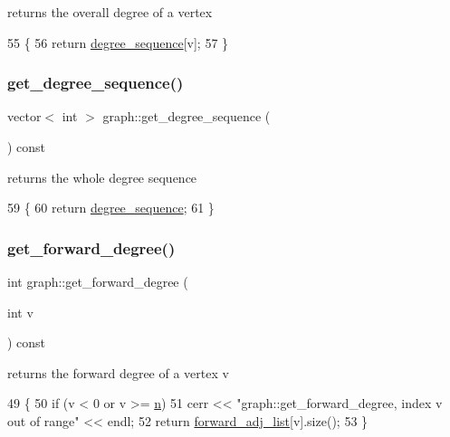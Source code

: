 returns the overall degree of a vertex 


\begin{DoxyCode}
55                                 \{
56   \textcolor{keywordflow}{return} \hyperlink{classgraph_a0b31295672bfe37669c9eb3640977fe6}{degree\_sequence}[v];
57 \}
\end{DoxyCode}
\mbox{\label{classgraph_afdca627df7fb93a7d1d8a547f616e948}} 
\subsubsection{\texorpdfstring{get\+\_\+degree\+\_\+sequence()}{get\_degree\_sequence()}}
{\footnotesize\ttfamily vector$<$ int $>$ graph\+::get\+\_\+degree\+\_\+sequence (\begin{DoxyParamCaption}{ }\end{DoxyParamCaption}) const}



returns the whole degree sequence 


\begin{DoxyCode}
59                                             \{
60   \textcolor{keywordflow}{return} \hyperlink{classgraph_a0b31295672bfe37669c9eb3640977fe6}{degree\_sequence};
61 \}
\end{DoxyCode}
\mbox{\label{classgraph_a388b6ce292a4c49e3853e22bdce978de}} 
\subsubsection{\texorpdfstring{get\+\_\+forward\+\_\+degree()}{get\_forward\_degree()}}
{\footnotesize\ttfamily int graph\+::get\+\_\+forward\+\_\+degree (\begin{DoxyParamCaption}\item[{int}]{v }\end{DoxyParamCaption}) const}



returns the forward degree of a vertex v 


\begin{DoxyCode}
49                                         \{
50   \textcolor{keywordflow}{if} (v < 0 or v >= \hyperlink{classgraph_ac8b3474ce95c04087c312508ec1443b6}{n})
51     cerr << \textcolor{stringliteral}{"graph::get\_forward\_degree, index v out of range"} << endl;
52   \textcolor{keywordflow}{return} \hyperlink{classgraph_a7d6441850d586d6a99fb73df57b70362}{forward\_adj\_list}[v].size();
53 \}
\end{DoxyCode}
\mbox{\label{classgraph_aa8fbee52a7b3604dbbd9175040c7ead5}} 
